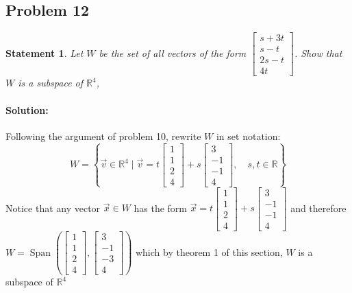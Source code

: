\documentclass[12pt, letterpaper]{article}
\newcommand{\R}{\mathbb{R}}
\theoremstyle{statement}
\theoremstyle{statement}
\newtheorem*{atmStat}{Statement}
\newenvironment{Solution}{\noindent\ignorespaces\paragraph{Solution:}}{\hfill \ding{122}\par\noindent}
\begin{document}
    \subsection*{Problem 12}
    \begin{atmStat}
    Let $W$ be the set of all vectors of the form $\begin{bmatrix} s+3t \\ s-t \\ 2s-t \\ 4t \end{bmatrix}$. Show that $W$ is a subspace of $\R^4$,
    \end{atmStat}
    \begin{Solution}
    Following the argument of problem 10, rewrite $W$ in set notation:
    $$
    W = \left\{ 
    \Vec{v} \in \R^4 \mid
    \Vec{v} = t \begin{bmatrix} 1\\1\\2\\4 \end{bmatrix} + s\begin{bmatrix} 3\\-1\\-1\\4\end{bmatrix}
    ,\,\,\,\,\,\, s,t\in\R
    \right\}
    $$
    Notice that any vector $\Vec{x}\in W$ has the form $\Vec{x}=t\begin{bmatrix}1\\1\\2\\4\end{bmatrix}+s\begin{bmatrix}3\\-1\\-1\\4\end{bmatrix}$ and therefore $W=\operatorname{Span}\left( 
    \begin{bmatrix} 1\\1\\2\\4\end{bmatrix},
    \begin{bmatrix}3\\-1\\-3\\4\end{bmatrix}
    \right)$ which by theorem 1 of this section, $W$ is a subspace of $\R^4$
    \end{Solution}
\end{document}

